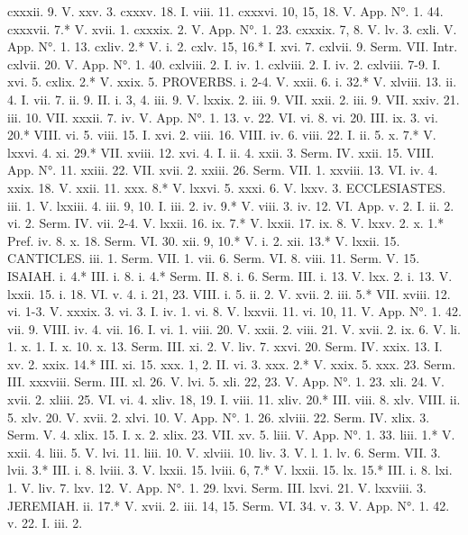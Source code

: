 cxxxii. 9.	V. xxv. 3.
cxxxv. 18.	I. viii. 11.
cxxxvi. 10, 15, 18.	V. App. N°. 1. 44.
cxxxvii. 7.*	V. xvii. 1.
cxxxix. 2.	V. App. N°. 1. 23.
cxxxix. 7, 8.	V. lv. 3.
cxli.	V. App. N°. 1. 13.
cxliv. 2.*	V. i. 2.
cxlv. 15, 16.*	I. xvi. 7.
cxlvii. 9.	Serm. VII. Intr.
cxlvii. 20.	V. App. N°. 1. 40.
cxlviii. 2.	I. iv. 1.
cxlviii. 2.	I. iv. 2.
cxlviii. 7-9.	I. xvi. 5.
cxlix. 2.*	V. xxix. 5.
PROVERBS.
i. 2-4.	V. xxii. 6.
i. 32.*	V. xlviii. 13.
ii. 4.	I. vii. 7.
ii. 9.	II. i. 3, 4.
iii. 9.	V. lxxix. 2.
iii. 9.	VII. xxii. 2.
iii. 9.	VII. xxiv. 21.
iii. 10.	VII. xxxii. 7.
iv.	V. App. N°. 1. 13.
v. 22.	VI. vi. 8.
vi. 20.	III. ix. 3.
vi. 20.*	VIII. vi. 5.
viii. 15.	I. xvi. 2.
viii. 16.	VIII. iv. 6.
viii. 22.	I. ii. 5.
x. 7.*	V. lxxvi. 4.
xi. 29.*	VII. xviii. 12.
xvi. 4.	I. ii. 4.
xxii. 3.	Serm. IV.
xxii. 15.	VIII. App. N°. 11.
xxiii. 22.	VII. xvii. 2.
xxiii. 26.	Serm. VII. 1.
xxviii. 13.	VI. iv. 4.
xxix. 18.	V. xxii. 11.
xxx. 8.*	V. lxxvi. 5.
xxxi. 6.	V. lxxv. 3.
ECCLESIASTES.
iii. 1.	V. lxxiii. 4.
iii. 9, 10.	I. iii. 2.
iv. 9.*	V. viii. 3.
iv. 12.	VI. App.
v. 2.	I. ii. 2.
vi. 2.	Serm. IV.
vii. 2-4.	V. lxxii. 16.
ix. 7.*	V. lxxii. 17.
ix. 8.	V. lxxv. 2.
x. 1.*	Pref. iv. 8.
x. 18.	Serm. VI. 30.
xii. 9, 10.*	V. i. 2.
xii. 13.*	V. lxxii. 15.
CANTICLES.
iii. 1.	Serm. VII. 1.
vii. 6.	Serm. VI. 8.
viii. 11.	Serm. V. 15.
ISAIAH.
i. 4.*	III. i. 8.
i. 4.*	Serm. II. 8.
i. 6.	Serm. III.
i. 13.	V. lxx. 2.
i. 13.	V. lxxii. 15.
i. 18.	VI. v. 4.
i. 21, 23.	VIII. i. 5.
ii. 2.	V. xvii. 2.
iii. 5.*	VII. xviii. 12.
vi. 1-3.	V. xxxix. 3.
vi. 3.	I. iv. 1.
vi. 8.	V. lxxvii. 11.
vi. 10, 11.	V. App. N°. 1. 42.
vii. 9.	VIII. iv. 4.
vii. 16.	I. vi. 1.
viii. 20.	V. xxii. 2.
viii. 21.	V. xvii. 2.
ix. 6.	V. li. 1.
x. 1.	I. x. 10.
x. 13.	Serm. III.
xi. 2.	V. liv. 7.
xxvi. 20.	Serm. IV.
xxix. 13.	I. xv. 2.
xxix. 14.*	III. xi. 15.
xxx. 1, 2.	II. vi. 3.
xxx. 2.*	V. xxix. 5.
xxx. 23.	Serm. III.
xxxviii.	Serm. III.
xl. 26.	V. lvi. 5.
xli. 22, 23.	V. App. N°. 1. 23.
xli. 24.	V. xvii. 2.
xliii. 25.	VI. vi. 4.
xliv. 18, 19.	I. viii. 11.
xliv. 20.*	III. viii. 8.
xlv.	VIII. ii. 5.
xlv. 20.	V. xvii. 2.
xlvi. 10.	V. App. N°. 1. 26.
xlviii. 22.	Serm. IV.
xlix. 3.	Serm. V. 4.
xlix. 15.	I. x. 2.
xlix. 23.	VII. xv. 5.
liii.	V. App. N°. 1. 33.
liii. 1.*	V. xxii. 4.
liii. 5.	V. lvi. 11.
liii. 10.	V. xlviii. 10.
liv. 3.	V. l. 1.
lv. 6.	Serm. VII. 3.
lvii. 3.*	III. i. 8.
lviii. 3.	V. lxxii. 15.
lviii. 6, 7.*	V. lxxii. 15.
lx. 15.*	III. i. 8.
lxi. 1.	V. liv. 7.
lxv. 12.	V. App. N°. 1. 29.
lxvi.	Serm. III.
lxvi. 21.	V. lxxviii. 3.
JEREMIAH.
ii. 17.*	V. xvii. 2.
iii. 14, 15.	Serm. VI. 34.
v. 3.	V. App. N°. 1. 42.
v. 22.	I. iii. 2.
